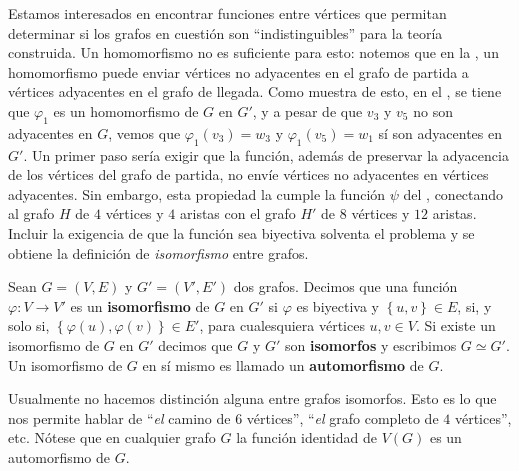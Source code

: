 Estamos interesados en encontrar funciones entre vértices que permitan determinar si los grafos en cuestión son ``indistinguibles'' para la teoría construida. Un homomorfismo no es suficiente para esto: notemos que en la , un homomorfismo puede enviar vértices no adyacentes en el grafo de partida a vértices adyacentes en el grafo de llegada. Como muestra de esto, en el , se tiene que $\varphi_1$ es un homomorfismo de $G$ en $G'$, y a pesar de que $v_3$ y $v_5$ no son adyacentes en $G$, vemos que $\varphi_1(v_3)=w_3$ y $\varphi_1(v_5)=w_1$ sí son adyacentes en $G'$. Un primer paso sería exigir que la función, además de preservar la adyacencia de los vértices del grafo de partida, no envíe vértices no adyacentes en vértices adyacentes. Sin embargo, esta propiedad la cumple la función $\psi$ del , conectando al grafo $H$ de $4$ vértices y $4$ aristas con el grafo $H'$ de $8$ vértices y $12$ aristas. Incluir la exigencia de que la función sea biyectiva solventa el problema y se obtiene la definición de \textit{isomorfismo} entre grafos.
\begin{Def}
   Sean $G=(V,E)$ y $G'=(V',E')$ dos grafos. Decimos que una función $\varphi:V\to V'$ es un \textbf{isomorfismo} de $G$ en $G'$ si $\varphi$ es biyectiva y $\left\lbrace u,v\right\rbrace\in E$, si, y solo si, $\left\lbrace \varphi(u), \varphi(v)\right\rbrace\in E'$, para cualesquiera vértices $u,v\in V$. Si existe un isomorfismo de $G$ en $G'$ decimos que $G$ y $G'$ son \textbf{isomorfos} y escribimos $G\simeq G'$. Un isomorfismo de $G$ en sí mismo es llamado un \textbf{automorfismo} de $G$.
\end{Def}
Usualmente no hacemos distinción alguna entre grafos isomorfos. Esto es lo que nos permite hablar de ``\textit{el} camino de $6$ vértices'', ``\textit{el} grafo completo de $4$ vértices'', etc. Nótese que en cualquier grafo $G$ la función identidad de $V(G)$ es un automorfismo de $G$.
